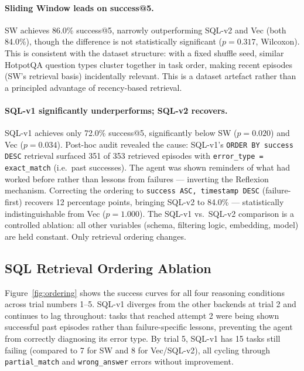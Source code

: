 \documentclass{article}
\begin{document}
\paragraph{Sliding Window leads on success@5.}
SW achieves 86.0\% success@5, narrowly outperforming SQL-v2 and Vec (both
84.0\%), though the difference is not statistically significant ($p = 0.317$,
Wilcoxon). This is consistent with the dataset structure: with a fixed shuffle
seed, similar HotpotQA question types cluster together in task order, making
recent episodes (SW's retrieval basis) incidentally relevant. This is a dataset
artefact rather than a principled advantage of recency-based retrieval.

\paragraph{SQL-v1 significantly underperforms; SQL-v2 recovers.}
SQL-v1 achieves only 72.0\% success@5, significantly below SW ($p = 0.020$)
and Vec ($p = 0.034$). Post-hoc audit revealed the cause: SQL-v1's
\texttt{ORDER BY success DESC} retrieval surfaced 351 of 353 retrieved episodes
with \texttt{error\_type = exact\_match} (i.e.\ past successes). The agent was
shown reminders of what had worked before rather than lessons from failures ---
inverting the Reflexion mechanism. Correcting the ordering to
\texttt{success ASC, timestamp DESC} (failure-first) recovers 12 percentage
points, bringing SQL-v2 to 84.0\% --- statistically indistinguishable from Vec
($p = 1.000$). The SQL-v1 vs.\ SQL-v2 comparison is a controlled ablation: all
other variables (schema, filtering logic, embedding, model) are held constant.
Only retrieval ordering changes.

\subsection{SQL Retrieval Ordering Ablation}
\label{sec:ordering}

Figure~\ref{fig:ordering} shows the success curves for all four reasoning
conditions across trial numbers 1--5. SQL-v1 diverges from the other backends
at trial 2 and continues to lag throughout: tasks that reached attempt 2 were
being shown successful past episodes rather than failure-specific lessons,
preventing the agent from correctly diagnosing its error type. By trial 5,
SQL-v1 has 15 tasks still failing (compared to 7 for SW and 8 for Vec/SQL-v2),
all cycling through \texttt{partial\_match} and \texttt{wrong\_answer} errors
without improvement.
\end{document}
